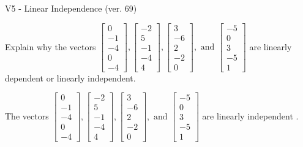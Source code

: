 \begin{exercise}
  \begin{exerciseTitle}V5 - Linear Independence (ver. 69)\end{exerciseTitle}
  \begin{exerciseStatement}
    Explain why the vectors \(\left[\begin{array}{r}
0 \\
-1 \\
-4 \\
0 \\
-4
\end{array}\right] , \left[\begin{array}{r}
-2 \\
5 \\
-1 \\
-4 \\
4
\end{array}\right] , \left[\begin{array}{r}
3 \\
-6 \\
2 \\
-2 \\
0
\end{array}\right] , \text{ and } \left[\begin{array}{r}
-5 \\
0 \\
3 \\
-5 \\
1
\end{array}\right]\) are linearly dependent or linearly independent.	


  \end{exerciseStatement}
  \begin{exerciseAnswer}
   The vectors \(\left[\begin{array}{r}
0 \\
-1 \\
-4 \\
0 \\
-4
\end{array}\right] , \left[\begin{array}{r}
-2 \\
5 \\
-1 \\
-4 \\
4
\end{array}\right] , \left[\begin{array}{r}
3 \\
-6 \\
2 \\
-2 \\
0
\end{array}\right] , \text{ and } \left[\begin{array}{r}
-5 \\
0 \\
3 \\
-5 \\
1
\end{array}\right]\) are 
  	 linearly independent  .
  


  \end{exerciseAnswer}
\end{exercise}